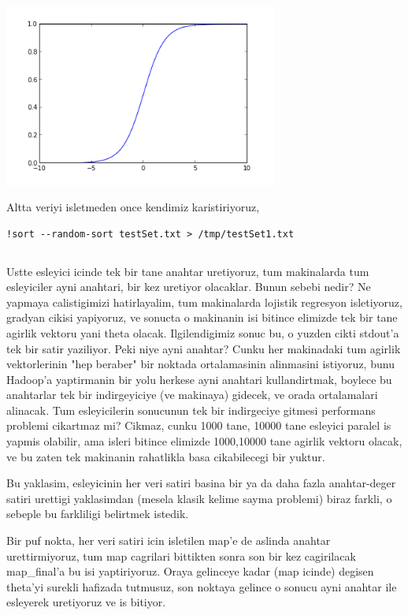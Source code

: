 \documentclass[12pt,fleqn]{article}\usepackage{../common}
\begin{document}
\includegraphics[height=6cm]{logreg1.png}

Altta veriyi isletmeden once kendimiz karistiriyoruz,

\begin{verbatim}
!sort --random-sort testSet.txt > /tmp/testSet1.txt
\end{verbatim}

\inputminted{python}{logreg.py}

Ustte esleyici icinde tek bir tane anahtar uretiyoruz, tum makinalarda tum
esleyiciler ayni anahtari, bir kez uretiyor olacaklar. Bunun sebebi nedir?
Ne yapmaya calistigimizi hatirlayalim, tum makinalarda lojistik regresyon
isletiyoruz, gradyan cikisi yapiyoruz, ve sonucta o makinanin isi bitince
elimizde tek bir tane agirlik vektoru yani theta olacak. Ilgilendigimiz
sonuc bu, o yuzden cikti stdout'a tek bir satir yaziliyor. Peki niye ayni
anahtar? Cunku her makinadaki tum agirlik vektorlerinin "hep beraber" bir
noktada ortalamasinin alinmasini istiyoruz, bunu Hadoop'a yaptirmanin bir
yolu herkese ayni anahtari kullandirtmak, boylece bu anahtarlar tek bir
indirgeyiciye (ve makinaya) gidecek, ve orada ortalamalari alinacak. Tum
esleyicilerin sonucunun tek bir indirgeciye gitmesi performans problemi
cikartmaz mi? Cikmaz, cunku 1000 tane, 10000 tane esleyici paralel is
yapmis olabilir, ama isleri bitince elimizde 1000,10000 tane agirlik
vektoru olacak, ve bu zaten tek makinanin rahatlikla basa cikabilecegi bir
yuktur.

Bu yaklasim, esleyicinin her veri satiri basina bir ya da daha fazla
anahtar-deger satiri urettigi yaklasimdan (mesela klasik kelime sayma
problemi) biraz farkli, o sebeple bu farkliligi belirtmek istedik.

Bir puf nokta, her veri satiri icin isletilen map'e de aslinda anahtar
urettirmiyoruz, tum map cagrilari bittikten sonra son bir kez cagirilacak
map\_final'a bu isi yaptiriyoruz. Oraya gelinceye kadar (map icinde) degisen
theta'yi surekli hafizada tutmusuz, son noktaya gelince o sonucu ayni
anahtar ile esleyerek uretiyoruz ve is bitiyor.
\end{document}

